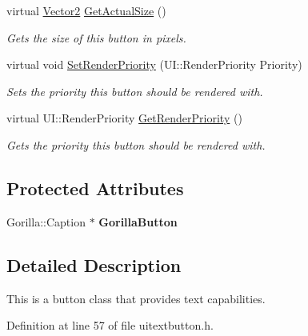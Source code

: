 \begin{DoxyCompactItemize}
virtual \hyperlink{classphys_1_1Vector2}{Vector2} \hyperlink{classphys_1_1UI_1_1TextButton_a062b31c199f875d4f825f6be1d11fb55}{GetActualSize} ()
\begin{DoxyCompactList}\small\item\em Gets the size of this button in pixels. \item\end{DoxyCompactList}\item 
virtual void \hyperlink{classphys_1_1UI_1_1TextButton_a7d4e22acd792b10f2f7986d8f449ec16}{SetRenderPriority} (UI::RenderPriority Priority)
\begin{DoxyCompactList}\small\item\em Sets the priority this button should be rendered with. \item\end{DoxyCompactList}\item 
virtual UI::RenderPriority \hyperlink{classphys_1_1UI_1_1TextButton_ad339621af6e73ff9702c0dd4cdadbb73}{GetRenderPriority} ()
\begin{DoxyCompactList}\small\item\em Gets the priority this button should be rendered with. \item\end{DoxyCompactList}\end{DoxyCompactItemize}
\subsection*{Protected Attributes}
\begin{DoxyCompactItemize}
\item 
\hypertarget{classphys_1_1UI_1_1TextButton_a33fe39747602f948b462e008cb75bb5e}{
Gorilla::Caption $\ast$ {\bfseries GorillaButton}}
\label{df/d03/classphys_1_1UI_1_1TextButton_a33fe39747602f948b462e008cb75bb5e}

\end{DoxyCompactItemize}


\subsection{Detailed Description}
This is a button class that provides text capabilities. 

Definition at line 57 of file uitextbutton.h.



